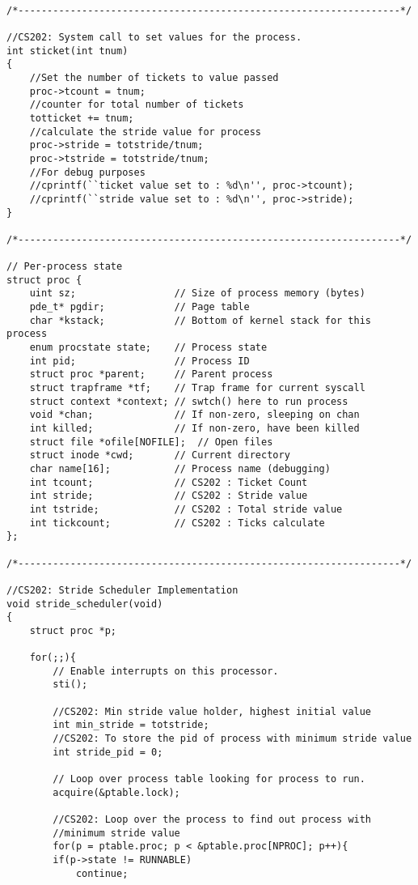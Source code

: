 \documentclass[a4paper, 10pt]{article}
\begin{document}
\begin{lstlisting}

/*------------------------------------------------------------------*/

//CS202: System call to set values for the process.
int sticket(int tnum)
{
    //Set the number of tickets to value passed
    proc->tcount = tnum;
    //counter for total number of tickets
    totticket += tnum;
    //calculate the stride value for process
    proc->stride = totstride/tnum;
    proc->tstride = totstride/tnum;
    //For debug purposes
    //cprintf(``ticket value set to : %d\n'', proc->tcount);
    //cprintf(``stride value set to : %d\n'', proc->stride);
}

/*------------------------------------------------------------------*/

// Per-process state
struct proc {
    uint sz;                 // Size of process memory (bytes)
    pde_t* pgdir;            // Page table
    char *kstack;            // Bottom of kernel stack for this process
    enum procstate state;    // Process state
    int pid;                 // Process ID
    struct proc *parent;     // Parent process
    struct trapframe *tf;    // Trap frame for current syscall
    struct context *context; // swtch() here to run process
    void *chan;              // If non-zero, sleeping on chan
    int killed;              // If non-zero, have been killed
    struct file *ofile[NOFILE];  // Open files
    struct inode *cwd;       // Current directory
    char name[16];           // Process name (debugging)
    int tcount;              // CS202 : Ticket Count
    int stride;              // CS202 : Stride value
    int tstride;             // CS202 : Total stride value
    int tickcount;           // CS202 : Ticks calculate
};

/*------------------------------------------------------------------*/

//CS202: Stride Scheduler Implementation
void stride_scheduler(void)
{
    struct proc *p;

    for(;;){
        // Enable interrupts on this processor.
        sti();

        //CS202: Min stride value holder, highest initial value
        int min_stride = totstride;
        //CS202: To store the pid of process with minimum stride value
        int stride_pid = 0;

        // Loop over process table looking for process to run.
        acquire(&ptable.lock);

        //CS202: Loop over the process to find out process with
        //minimum stride value
        for(p = ptable.proc; p < &ptable.proc[NPROC]; p++){
        if(p->state != RUNNABLE)
            continue;


\end{lstlisting}
\end{document}

